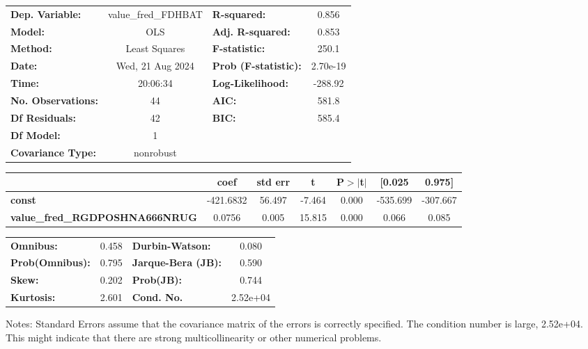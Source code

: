 \begin{center}
\begin{tabular}{lclc}
\toprule
\textbf{Dep. Variable:}                & value\_fred\_FDHBAT & \textbf{  R-squared:         } &     0.856   \\
\textbf{Model:}                        &         OLS         & \textbf{  Adj. R-squared:    } &     0.853   \\
\textbf{Method:}                       &    Least Squares    & \textbf{  F-statistic:       } &     250.1   \\
\textbf{Date:}                         &   Wed, 21 Aug 2024  & \textbf{  Prob (F-statistic):} &  2.70e-19   \\
\textbf{Time:}                         &       20:06:34      & \textbf{  Log-Likelihood:    } &   -288.92   \\
\textbf{No. Observations:}             &            44       & \textbf{  AIC:               } &     581.8   \\
\textbf{Df Residuals:}                 &            42       & \textbf{  BIC:               } &     585.4   \\
\textbf{Df Model:}                     &             1       & \textbf{                     } &             \\
\textbf{Covariance Type:}              &      nonrobust      & \textbf{                     } &             \\
\bottomrule
\end{tabular}
\begin{tabular}{lcccccc}
                                       & \textbf{coef} & \textbf{std err} & \textbf{t} & \textbf{P$> |$t$|$} & \textbf{[0.025} & \textbf{0.975]}  \\
\midrule
\textbf{const}                         &    -421.6832  &       56.497     &    -7.464  &         0.000        &     -535.699    &     -307.667     \\
\textbf{value\_fred\_RGDPOSHNA666NRUG} &       0.0756  &        0.005     &    15.815  &         0.000        &        0.066    &        0.085     \\
\bottomrule
\end{tabular}
\begin{tabular}{lclc}
\textbf{Omnibus:}       &  0.458 & \textbf{  Durbin-Watson:     } &    0.080  \\
\textbf{Prob(Omnibus):} &  0.795 & \textbf{  Jarque-Bera (JB):  } &    0.590  \\
\textbf{Skew:}          &  0.202 & \textbf{  Prob(JB):          } &    0.744  \\
\textbf{Kurtosis:}      &  2.601 & \textbf{  Cond. No.          } & 2.52e+04  \\
\bottomrule
\end{tabular}
\end{center}

Notes: \newline
 [1] Standard Errors assume that the covariance matrix of the errors is correctly specified. \newline
 [2] The condition number is large, 2.52e+04. This might indicate that there are \newline
 strong multicollinearity or other numerical problems.
